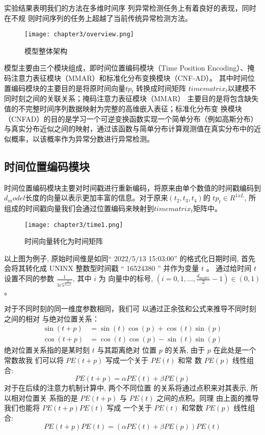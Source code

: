 实验结果表明我们的方法在多维时间序 列异常检测任务上有着良好的表现，同时在不规 则时间序列的任务上超越了当前传统异常检测方法。

\begin{figure}[htb]
  \centering
  \texttt{[image: chapter3/overview.png]}
  \caption{模型整体架构}
  \end{figure}

模型主要由三个模块组成，即时间位置编码模块（Time Position Encoding）、掩码注意力表征模块（MMAR）和标准化分布变换模块（CNF-AD）。
其中时间位置编码模块的主要目的是将原时间向量$tp_t$ 转换成时间矩阵 $timematrix_t$以建模不同时刻之间的关联关系；掩码注意力表征模块（MMAR） 主要目的是将包含缺失值的不完整时间序列数据映射为完整的高维嵌入表征；标准化分布变 换模块（CNFAD）的目的是学习一个可逆变换函数实现一个简单分布（例如高斯分布）与真实分布近似之间的映射，通过该函数与简单分布计算观测值在真实分布中的近似概率，以该概率作为异常分数进行异常检测。
\subsection{时间位置编码模块}

  时间位置编码模块主要对时间戳进行重新编码，将原来由单个数值的时间戳编码到$d_model$长度的向量以表示更加丰富的信息。对于原来$(t_2,t_3,t_4)$的 $tp_t\in R^{1 x L}$, 所组成的时间戳向量我们会通过位置编码来映射到$timematrix_t$矩阵中。
  \begin{figure}[ht]
    \centering
    \texttt{[image: chapter3/time1.png]}
    \caption{时间向量转化为时间矩阵}
    \end{figure}
  
  
  
  以上图为例子, 原始时间倠是如同“ $2022 / 5 / 13$ 15:03:00” 的格式化日期时间, 首先会将其转化成 UNINX 整数型时间戳 “ 16524380 ” 并作为变量 $t$ 。 通过给时间 $t$ 设置不同的参数 $\frac{1}{1 e 5^{\frac{2 i}{d_{\text {model }}}}}$, 其中 $i$ 为 向量中的标号, $\left(i=0,1, \ldots, \frac{d_{\text {model }}}{2}-1\right) \in(0,1)$ 。
  
  对于不同时刻的同一维度参数相同，我们可 以通过正余弦和公式来推导不同时刻之间的相对 与绝对位置关系：
  \begin{equation}
    \begin{aligned}
    \sin (t+p) &=\sin (t) \cos (p)+\cos (t) \sin (p) \\
    \cos (t+p) &=\cos (t) \cos (p)-\sin (t) \sin (p)
    \end{aligned}
    \end{equation}
  绝对位置关系指的是某时刻 $t$ 与其距离绝对 位置 $p$ 的关系, 由于 $p$ 在此处是一个常数故我 们可以将 $P E(t+p)$ 写成一个关于 $P E(t)$ 和常 数 $P E(p)$ 线性组合:
  \begin{equation}
    P E(t+p)=\alpha P E(t)+\beta P E(p)
    \end{equation}
  对于在后续的注意力机制计算中, 两个不同位置 的关系将通过点积来对其表示, 所以相对位置关 系指的是 $P E(t+p)$ 与 $P E(t)$ 之间的点积。同理 由上面的推导我们也能将 $P E(t+p) P E(t)$ 写成 一个关于 $P E(t)$ 和常数 $P E(p)$ 线性组合:
    \begin{equation}
      P E(t+p) P E(t)=(\alpha P E(t)+\beta P E(p)) P E(t)
    \end{equation}
  
